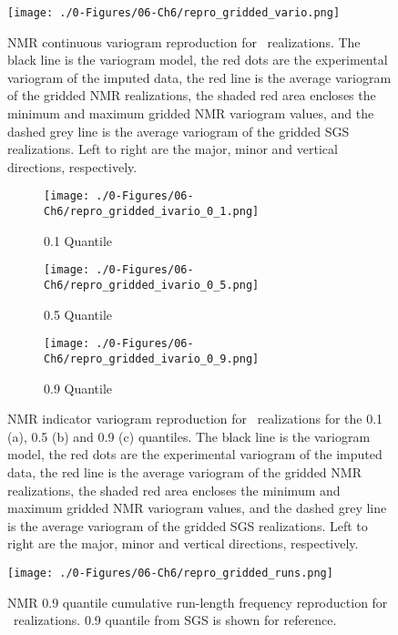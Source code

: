 \begin{figure}[htb!]
    \centering
    \texttt{[image: ./0-Figures/06-Ch6/repro\_gridded\_vario.png]}
    \caption{\gls{NMR} continuous variogram reproduction for \csnreals \ realizations. The black line is the variogram model, the red dots are the experimental variogram of the imputed data, the red line is the average variogram of the gridded \gls{NMR} realizations, the shaded red area encloses the minimum and maximum gridded \gls{NMR} variogram values, and the dashed grey line is the average variogram of the gridded \gls{SGS} realizations. Left to right are the major, minor and vertical directions, respectively.}
    \label{fig:repro_gridded_vario}
\end{figure}

\begin{figure}
    \begin{subfigure}{1.0\textwidth}
        \centering
        \texttt{[image: ./0-Figures/06-Ch6/repro\_gridded\_ivario\_0\_1.png]}
        \caption{0.1 Quantile}
    \end{subfigure}
    \begin{subfigure}{1.0\textwidth}
        \centering
        \texttt{[image: ./0-Figures/06-Ch6/repro\_gridded\_ivario\_0\_5.png]}
        \caption{0.5 Quantile}
    \end{subfigure}
    \begin{subfigure}{1.0\textwidth}
        \centering
        \texttt{[image: ./0-Figures/06-Ch6/repro\_gridded\_ivario\_0\_9.png]}
        \caption{0.9 Quantile}
    \end{subfigure}
    \caption{\gls{NMR} indicator variogram reproduction for \csnreals \ realizations for the 0.1 (a), 0.5 (b) and 0.9 (c) quantiles. The black line is the variogram model, the red dots are the experimental variogram of the imputed data, the red line is the average variogram of the gridded \gls{NMR} realizations, the shaded red area encloses the minimum and maximum gridded \gls{NMR} variogram values, and the dashed grey line is the average variogram of the gridded \gls{SGS} realizations. Left to right are the major, minor and vertical directions, respectively.}
    \label{fig:repro_gridded_ivario}
\end{figure}

\begin{figure}[htb!]
    \centering
    \texttt{[image: ./0-Figures/06-Ch6/repro\_gridded\_runs.png]}
    \caption{\gls{NMR} 0.9 quantile cumulative run-length frequency reproduction for \csnreals \ realizations. 0.9 quantile from \gls{SGS} is shown for reference.}
    \label{fig:repro_gridded_runs}
\end{figure}


